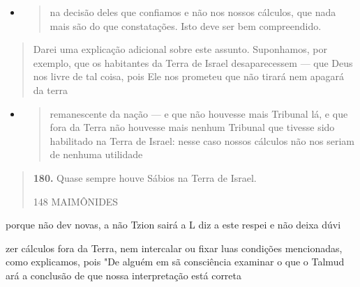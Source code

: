 \begin{itemize}
\item
  \begin{quote}
  na decisão deles que confiamos e não nos nossos cálculos, que nada
  mais são do que constatações. Isto deve ser bem compreendido.
  \end{quote}
\end{itemize}

\begin{quote}
Darei uma explicação adicional sobre este assunto. Suponhamos, por
exemplo, que os habitantes da Terra de Israel desaparecessem --- que
Deus nos livre de tal coisa, pois Ele nos prometeu que não tirará nem
apagará da terra
\end{quote}

\begin{itemize}
\item
  \begin{quote}
  remanescente da nação --- e que não houvesse mais Tribunal lá, e que
  fora da Terra não houvesse mais nenhum Tribunal que tivesse sido
  habilitado na Terra de Israel: nesse caso nossos cálculos não nos
  seriam de nenhuma utilidade
  \end{quote}
\end{itemize}

\begin{quote}
\textbf{180.} Quase sempre houve Sábios na Terra de Israel.

148 MAIMÔNIDES
\end{quote}

porque não dev novas, a não Tzion sairá a L diz a este respei e não
deixa dúvi

zer cálculos fora da Terra, nem intercalar ou fixar luas condições
mencionadas, como explicamos, pois "De alguém em sã consciência examinar
o que o Talmud ará a conclusão de que nossa interpretação está correta

